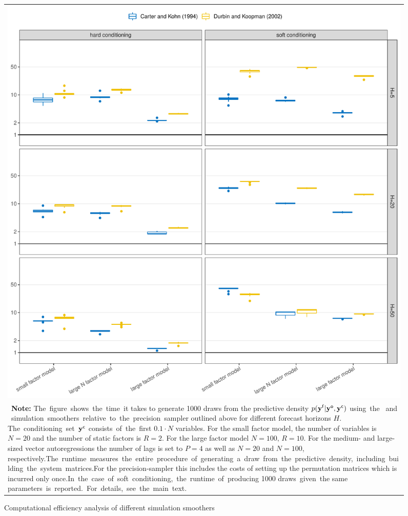 \documentclass[notitlepage,a4paper,12pt]{article}
\begin{document}
\begin{figure}[htbp] \centering
    \caption{Computational efficiency analysis of different simulation smoothers \label{figsimulation}}
    \footnotesize
    \begin{tabular}{p{16cm}}
    \multicolumn{1}{c}{\includegraphics*[scale = 0.6]{../figures/fig_simulations_Ncond_10.pdf}} \\
    {
    \footnotesize \textbf{Note:} The figure shows the time it takes to generate 1000 draws from the predictive density $p(\mathbf{y^{\sf{f}}}|\mathbf{y^{\sf{o}}}, \mathbf{y^{\sf{c}}})$ using the \citet{carterkohn1994_biomtr} and \citet{durbinkoopman2002_biomtr} simulation smoothers relative to the precision sampler outlined above for different forecast horizons $H$. The conditioning set $\mathbf{y}^{\sf{c}}$ consists of the first $0.1\cdot N$ variables. For the small factor model, the number of variables is $N=20$ and the number of static factors is $R=2$. For the large factor model $N=100,\, R = 10$. For the medium- and large-sized vector autoregressions the number of lags is set to $P=4$ as well as $N=20$ and $N=100$, respectively.The runtime measures the entire procedure of generating a draw from the predictive density, including building the system matrices.For the precision-sampler this includes the costs of setting up the permutation matrices which is incurred only once.In the case of soft conditioning, the runtime of producing 1000 draws given the same parameters is reported. For details, see the main text.
    }
    \end{tabular}
    \newline
    \normalsize
    \end{figure}
\end{document}
